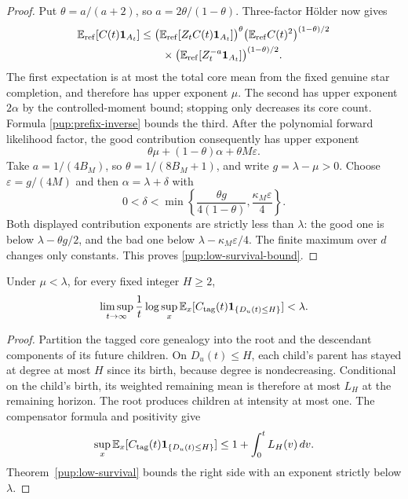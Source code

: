 \begin{proof}
Put $\theta=a/(a+2)$, so $a=2\theta/(1-\theta)$.  Three-factor
H\"older now gives
\begin{align*}
 \mathbb E_{\rm ref}[C(t)\mathbf1_{A_t}]
 &\le
 \bigl(\mathbb E_{\rm ref}[Z_tC(t)\mathbf1_{A_t}]\bigr)^\theta
 \bigl(\mathbb E_{\rm ref}C(t)^2\bigr)^{(1-\theta)/2}\\
 &\qquad\times
 \bigl(\mathbb E_{\rm ref}[Z_t^{-a}\mathbf1_{A_t}]\bigr)^{(1-\theta)/2}.
\end{align*}
The first expectation is at most the total core mean from the fixed
genuine star completion, and therefore has upper exponent $\mu$.
The second has upper exponent $2\alpha$ by the controlled-moment
bound; stopping only decreases its core count.  Formula
\eqref{pup:prefix-inverse} bounds the third.  After the polynomial
forward likelihood factor, the good contribution consequently has
upper exponent
\[
 \theta\mu+(1-\theta)\alpha+\theta M\varepsilon.
\]
Take $a=1/(4B_M)$, so $\theta=1/(8B_M+1)$, and write
$g=\lambda-\mu>0$.  Choose $\varepsilon=g/(4M)$ and then
$\alpha=\lambda+\delta$ with
\[
 0<\delta<
 \min\left\{\frac{\theta g}{4(1-\theta)},
              \frac{\kappa_M\varepsilon}{4}\right\}.
\]
Both displayed contribution exponents are strictly less than $\lambda$:
the good one is below $\lambda-\theta g/2$, and the bad one below
$\lambda-\kappa_M\varepsilon/4$.  The finite maximum over $d$ changes
only constants.  This proves \eqref{pup:low-survival-bound}.
\end{proof}

\begin{corollary}
\label{pup:root-stay}
Under $\mu<\lambda$, for every fixed integer $H\ge2$,
\[
 \limsup_{t\to\infty}\frac1t\log\sup_x
 \mathbb E_x[C_{\rm tag}(t)\mathbf1_{\{D_u(t)\le H\}}]<\lambda.
\]
\end{corollary}
\begin{proof}
Partition the tagged core genealogy into the root and the descendant
components of its future children. On $D_u(t)\le H$, each child's
parent has stayed at degree at most $H$ since its birth, because degree
is nondecreasing. Conditional on the child's birth, its weighted
remaining mean is therefore at most $L_H$ at the remaining horizon.
The root produces children at intensity at most one. The compensator
formula and positivity give
\[
 \sup_x\mathbb E_x[C_{\rm tag}(t)\mathbf1_{\{D_u(t)\le H\}}]
 \le1+\int_0^tL_H(v)\,dv.
\]
Theorem~\ref{pup:low-survival} bounds the right side with an exponent
strictly below $\lambda$.
\end{proof}

